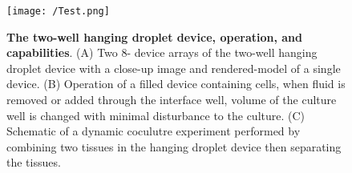 \begin{figure}[ht] %
\centering
\texttt{[image: /Test.png]}
\caption{\textbf{The two-well hanging droplet device, operation, and capabilities}. (A) Two 8- device arrays of the two-well hanging droplet device with a close-up image and rendered-model of a single device. (B) Operation of a filled device containing cells, when fluid is removed or added through the interface well, volume of the culture well is changed with minimal disturbance to the culture. (C) Schematic of a dynamic coculutre experiment performed by combining two tissues in the hanging droplet device then separating the tissues.}
\label{figure:test}
\end{figure}



